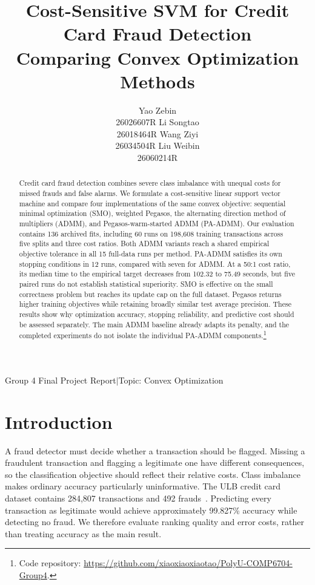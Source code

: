 \documentclass{article}
\title{Cost-Sensitive SVM for Credit Card Fraud Detection\\
Comparing Convex Optimization Methods}
\author{%
  Yao Zebin\\26026607R
  \And Li Songtao\\26018464R
  \And Wang Ziyi\\26034504R
  \And Liu Weibin\\26060214R
}
\newcommand{\RepositoryURL}{https://github.com/xiaoxiaoxiaotao/PolyU-COMP6704-Group4}
\newcommand{\repositorynote}{Code repository: \expandafter\url\expandafter{\RepositoryURL}.}
\begin{document}
\maketitle
\begin{center}\small Group 4 Final Project Report\quad$\vert$\quad Topic: Convex Optimization\end{center}

\begin{abstract}
Credit card fraud detection combines severe class imbalance with unequal costs for missed frauds and false alarms. We formulate a cost-sensitive linear support vector machine and compare four implementations of the same convex objective: sequential minimal optimization (SMO), weighted Pegasos, the alternating direction method of multipliers (ADMM), and Pegasos-warm-started ADMM (PA-ADMM). Our evaluation contains 136 archived fits, including 60 runs on 198,608 training transactions across five splits and three cost ratios. Both ADMM variants reach a shared empirical objective tolerance in all 15 full-data runs per method. PA-ADMM satisfies its own stopping conditions in 12 runs, compared with seven for ADMM. At a 50:1 cost ratio, its median time to the empirical target decreases from 102.32 to 75.49 seconds, but five paired runs do not establish statistical superiority. SMO is effective on the small correctness problem but reaches its update cap on the full dataset. Pegasos returns higher training objectives while retaining broadly similar test average precision. These results show why optimization accuracy, stopping reliability, and predictive cost should be assessed separately. The main ADMM baseline already adapts its penalty, and the completed experiments do not isolate the individual PA-ADMM components.\footnote{\repositorynote}
\end{abstract}

\section{Introduction}
\label{sec:intro}

A fraud detector must decide whether a transaction should be flagged. Missing a fraudulent transaction and flagging a legitimate one have different consequences, so the classification objective should reflect their relative costs. Class imbalance makes ordinary accuracy particularly uninformative. The ULB credit card dataset contains 284,807 transactions and 492 frauds~\citep{ulb}. Predicting every transaction as legitimate would achieve approximately 99.827\% accuracy while detecting no fraud. We therefore evaluate ranking quality and error costs, rather than treating accuracy as the main result.
\end{document}
